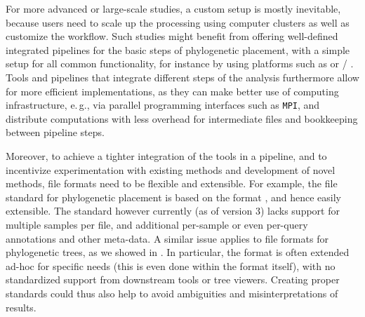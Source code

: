 For more advanced or large-scale studies, a custom setup is mostly inevitable,
because users need to scale up the processing using computer clusters as well as customize the workflow.
Such studies might benefit from offering well-defined integrated pipelines for the basic steps of phylogenetic placement,
with a simple setup for all common functionality, for instance by using platforms such as
 \cite{Afgan2018} or / \cite{Gruning2018}.
Tools and pipelines that integrate different steps of the analysis furthermore allow for more efficient implementations,
as they can make better use of computing infrastructure,
e.\,g., via parallel programming interfaces such as \texttt{\acs{MPI}},
and distribute computations with less overhead for intermediate files and bookkeeping between pipeline steps.


Moreover, to achieve a tighter integration of the tools in a pipeline,
and to incentivize experimentation with existing methods and development of novel methods,
file formats need to be flexible and extensible.
For example, the  file standard for phylogenetic placement \cite{Matsen2012}
is based on the  format \cite{JsonMemo,JsonStandard}, and hence easily extensible.
The standard however currently (as of  version 3) lacks support for multiple samples per file,
and additional per-sample or even per-query annotations and other meta-data.
A similar issue applies to file formats for phylogenetic trees, as we showed in .
In particular, the  format is often extended ad-hoc for specific needs
(this is even done within the  format itself),
with no standardized support from downstream tools or tree viewers.
Creating proper standards could thus also help to avoid ambiguities and misinterpretations of results.

